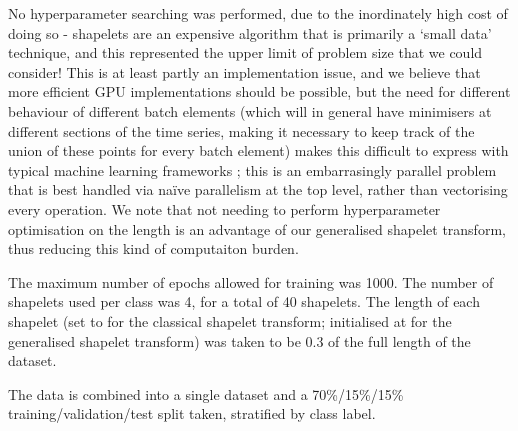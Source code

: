 \documentclass{article}
\theoremstyle{plain}
\theoremstyle{definition}
\begin{document}
	No hyperparameter searching was performed, due to the inordinately high cost of doing so - shapelets are an expensive algorithm that is primarily a `small data' technique, and this represented the upper limit of problem size that we could consider! This is at least partly an implementation issue, and we believe that more efficient GPU implementations should be possible, but the need for different behaviour of different batch elements (which will in general have minimisers at different sections of the time series, making it necessary to keep track of the union of these points for every batch element) makes this difficult to express with typical machine learning frameworks \cite{tensorflow, pytorch, jax}; this is an embarrasingly parallel problem that is best handled via na{\"i}ve parallelism at the top level, rather than vectorising every operation. We note that not needing to perform hyperparameter optimisation on the length is an advantage of our generalised shapelet transform, thus reducing this kind of computaiton burden.
	
	The maximum number of epochs allowed for training was 1000. The number of shapelets used per class was 4, for a total of 40 shapelets. The length of each shapelet (set to for the classical shapelet transform; initialised at for the generalised shapelet transform) was taken to be 0.3 of the full length of the dataset.
	
	The data is combined into a single dataset and a 70\%/15\%/15\% training/validation/test split taken, stratified by class label.
\end{document}
